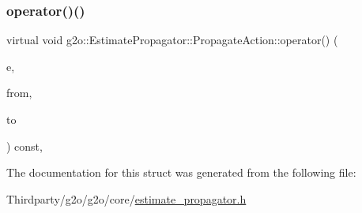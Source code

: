 \subsubsection{\texorpdfstring{operator()()}{operator()()}}
{\footnotesize\ttfamily virtual void g2o\+::\+Estimate\+Propagator\+::\+Propagate\+Action\+::operator() (\begin{DoxyParamCaption}\item[{\mbox{\hyperlink{classg2o_1_1_optimizable_graph_1_1_edge}{Optimizable\+Graph\+::\+Edge}} $\ast$}]{e,  }\item[{const \mbox{\hyperlink{classg2o_1_1_hyper_graph_a703938cdb4bb636860eed55a2489d70c}{Optimizable\+Graph\+::\+Vertex\+Set}} \&}]{from,  }\item[{\mbox{\hyperlink{classg2o_1_1_optimizable_graph_1_1_vertex}{Optimizable\+Graph\+::\+Vertex}} $\ast$}]{to }\end{DoxyParamCaption}) const\hspace{0.3cm}{\ttfamily [inline]}, {\ttfamily [virtual]}}



The documentation for this struct was generated from the following file\+:\begin{DoxyCompactItemize}
\item 
Thirdparty/g2o/g2o/core/\mbox{\hyperlink{estimate__propagator_8h}{estimate\+\_\+propagator.\+h}}\end{DoxyCompactItemize}
